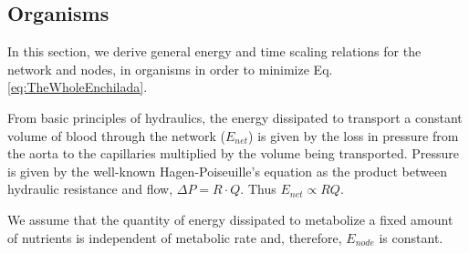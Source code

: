 \documentclass[12pt]{article}
\begin{document}


\subsection{Organisms}
\label{sec:organisms}

In this section, we derive general energy and time scaling relations 
for the network and nodes, in organisms in order to minimize Eq. \ref{eq:TheWholeEnchilada}.  

From basic principles of hydraulics, the energy dissipated to
transport a constant volume of blood through the network ($E_{net}$)
is given by the loss in pressure from the aorta to the capillaries
multiplied by the volume being transported.  Pressure is given by the
well-known Hagen-Poiseuille's equation as the product between
hydraulic resistance and flow, $\Delta P = R·Q$.  Thus $E_{net}
\propto RQ$.

We assume that the quantity of energy dissipated to metabolize a fixed 
amount of nutrients is independent of metabolic rate and, therefore, 
$E_{node}$ is constant.   

\end{document}
